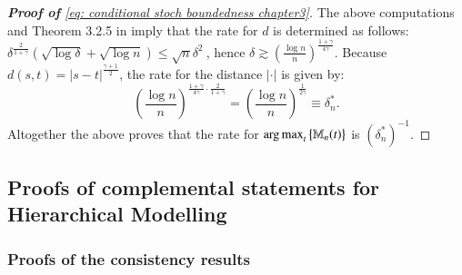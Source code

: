\begin{proof}[\hypertarget{proof of stoch boundedness}{\textbf{Proof of}} \eqref{eq: conditional stoch boundedness chapter3}]
		The above computations and Theorem 3.2.5 in \cite{5} imply that the rate for $d$ is determined as follows: $\delta^{\frac{2}{1+\gamma}} (\sqrt{\log{\delta}} + \sqrt{\log{n}}) \leq \sqrt{n} \delta^2 \ $, hence $ \delta \gtrsim \left( \frac{\log{n}}{n}\right)^{\frac{1+\gamma}{4 \gamma}}$.
		Because $d(s,t) = |s-t|^{\frac{\gamma+1}{2}}$, the rate for the distance $|\cdot|$ is given by: 
		$$\left( \frac{\log{n}}{n}\right)^{\frac{1+\gamma}{4 \gamma} \cdot \frac{2}{1+\gamma}} = \left( \frac{\log{n}}{n}\right)^{\frac{1}{2\gamma}} \equiv \delta^*_n.$$
		Altogether the above proves that the rate for $\operatorname*{arg\,max}_t \big\{ \mathbb{M}_n(t)\big\}$ is $(\delta^*_n)^{-1}$.
	\end{proof}

\subsection{Proofs of complemental statements for Hierarchical Modelling}

\subsubsection{Proofs of the consistency results}\label{III.sec: proof consistency results}

